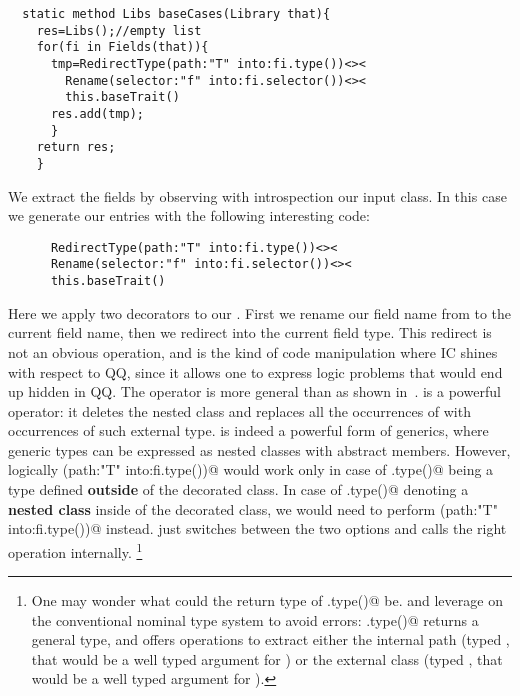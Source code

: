 \begin{lstlisting}
  static method Libs baseCases(Library that){
    res=Libs();//empty list
    for(fi in Fields(that)){
      tmp=RedirectType(path:"T" into:fi.type())<><
        Rename(selector:"f" into:fi.selector())<><
        this.baseTrait()
      res.add(tmp);
      }
    return res;
    }
\end{lstlisting}

We extract the fields by observing with introspection
our input class.
In this case we generate our entries with the following interesting code:

\begin{lstlisting}
      RedirectType(path:"T" into:fi.type())<><
      Rename(selector:"f" into:fi.selector())<><
      this.baseTrait()
\end{lstlisting}

Here we apply two decorators to our \Q@baseTrait@. First
we rename our field name from \Q@f@ to the current field name, then
 we redirect \Q@T@ into the current field type.
 This redirect is not an obvious operation, and is the kind of code manipulation where IC shines
with respect to QQ, since it allows one to express logic problems that would end up hidden in QQ.
 The operator \Q@RedirectType@ is more general than \Q@Redirect@ as shown in~\cite{servetto2014meta}.
 \Q@Redirect@ is a powerful operator:
 it deletes the nested class \Q@T@ and replaces all
 the occurrences of \Q@T@ with occurrences of such external type.
 \Q@Redirect@ is indeed a powerful form of generics,
 where generic types can be expressed as nested classes with abstract members.
 However, logically \Q@Redirect(path:"T" into:fi.type())@
 would work only in case of \Q@fi.type()@ being a type
 defined \textbf{outside} of the decorated class.
 In case of \Q@fi.type()@ denoting a \textbf{nested class} inside of the decorated class,
 we would need to perform \Q@Rename(path:"T" into:fi.type())@ instead.
 \Q@RedirectType@ just switches between the two options and calls the right operation internally.%
\footnote{
One may wonder what could the return type of \Q@fi.type()@
be. \Q@Rename@ and \Q@Redirect@ leverage on the
conventional nominal type system to avoid errors:
 \Q@fi.type()@ returns a general \Q@Type@ type, and offers operations to extract either
 the internal path (typed \Q@Path@, that would be a well typed argument for \Q@Rename@)
 or the external class (typed \Q@Class@, that would be a well typed argument for \Q@Redirect@).}


